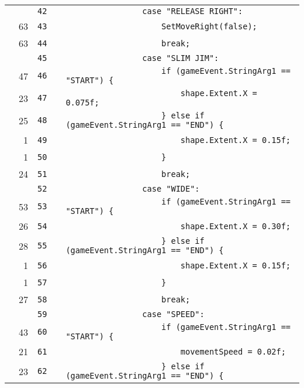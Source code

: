 \documentclass[a4paper,landscape,10pt]{article}
\begin{document}
\begin{longtable}[l]{lrrll}
\cellcolor{gray} &  & \verb~42~ & & \verb~                case "RELEASE RIGHT":~\\
\cellcolor{green} & 63 & \verb~43~ & & \verb~                    SetMoveRight(false);~\\
\cellcolor{green} & 63 & \verb~44~ & & \verb~                    break;~\\
\cellcolor{gray} &  & \verb~45~ & & \verb~                case "SLIM JIM":~\\
\cellcolor{green} & 47 & \verb~46~ & & \verb~                    if (gameEvent.StringArg1 == "START") {~\\
\cellcolor{green} & 23 & \verb~47~ & & \verb~                        shape.Extent.X = 0.075f;~\\
\cellcolor{green} & 25 & \verb~48~ & & \verb~                    } else if (gameEvent.StringArg1 == "END") {~\\
\cellcolor{green} & 1 & \verb~49~ & & \verb~                        shape.Extent.X = 0.15f;~\\
\cellcolor{green} & 1 & \verb~50~ & & \verb~                    }~\\
\cellcolor{green} & 24 & \verb~51~ & & \verb~                    break;~\\
\cellcolor{gray} &  & \verb~52~ & & \verb~                case "WIDE":~\\
\cellcolor{green} & 53 & \verb~53~ & & \verb~                    if (gameEvent.StringArg1 == "START") {~\\
\cellcolor{green} & 26 & \verb~54~ & & \verb~                        shape.Extent.X = 0.30f;~\\
\cellcolor{green} & 28 & \verb~55~ & & \verb~                    } else if (gameEvent.StringArg1 == "END") {~\\
\cellcolor{green} & 1 & \verb~56~ & & \verb~                        shape.Extent.X = 0.15f;~\\
\cellcolor{green} & 1 & \verb~57~ & & \verb~                    }~\\
\cellcolor{green} & 27 & \verb~58~ & & \verb~                    break;~\\
\cellcolor{gray} &  & \verb~59~ & & \verb~                case "SPEED":~\\
\cellcolor{green} & 43 & \verb~60~ & & \verb~                    if (gameEvent.StringArg1 == "START") {~\\
\cellcolor{green} & 21 & \verb~61~ & & \verb~                        movementSpeed = 0.02f;~\\
\cellcolor{green} & 23 & \verb~62~ & & \verb~                    } else if (gameEvent.StringArg1 == "END") {~\\

\end{longtable}
\end{document}
